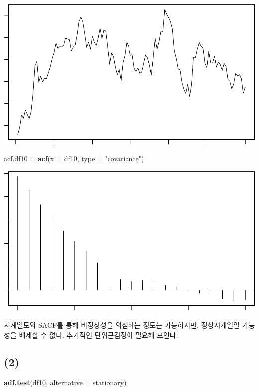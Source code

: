 \documentclass[
]{article}
\newenvironment{Shaded}{\begin{snugshade}}{\end{snugshade}}
\newcommand{\AttributeTok}[1]{\textcolor[rgb]{0.13,0.29,0.53}{#1}}
\newcommand{\FunctionTok}[1]{\textcolor[rgb]{0.13,0.29,0.53}{\textbf{#1}}}
\newcommand{\NormalTok}[1]{#1}
\newcommand{\OtherTok}[1]{\textcolor[rgb]{0.56,0.35,0.01}{#1}}
\newcommand{\StringTok}[1]{\textcolor[rgb]{0.31,0.60,0.02}{#1}}
\begin{document}
\begin{center}\includegraphics[width=0.8\linewidth]{Timeseries_Analysis_HW4_files/figure-latex/unnamed-chunk-5-1} \end{center}

\begin{Shaded}
\begin{Highlighting}[]
\NormalTok{acf.df10 }\OtherTok{=} \FunctionTok{acf}\NormalTok{(}\AttributeTok{x =}\NormalTok{ df10, }\AttributeTok{type =} \StringTok{"covariance"}\NormalTok{)}
\end{Highlighting}
\end{Shaded}

\begin{center}\includegraphics[width=0.8\linewidth]{Timeseries_Analysis_HW4_files/figure-latex/unnamed-chunk-5-2} \end{center}

시계열도와 SACF를 통해 비정상성을 의심하는 정도는 가능하지만,
정상시게열일 가능성을 배제할 수 없다. 추가적인 단위근검정이 필요해
보인다.

\subsection{(2)}\label{section-1}

\begin{Shaded}
\begin{Highlighting}[]
\FunctionTok{adf.test}\NormalTok{(df10, }\AttributeTok{alternative =} \StringTok{\textquotesingle{}stationary\textquotesingle{}}\NormalTok{)}
\end{Highlighting}
\end{Shaded}
\end{document}

